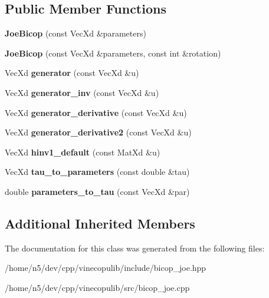 \subsection*{Public Member Functions}
\begin{DoxyCompactItemize}
\item 
{\bfseries Joe\+Bicop} (const Vec\+Xd \&parameters)\hypertarget{class_joe_bicop_a15feadcf7028ba91c041c05f7033289d}{}\label{class_joe_bicop_a15feadcf7028ba91c041c05f7033289d}

\item 
{\bfseries Joe\+Bicop} (const Vec\+Xd \&parameters, const int \&rotation)\hypertarget{class_joe_bicop_aae0e184fda31ed3a78520f70d4f4102e}{}\label{class_joe_bicop_aae0e184fda31ed3a78520f70d4f4102e}

\item 
Vec\+Xd {\bfseries generator} (const Vec\+Xd \&u)\hypertarget{class_joe_bicop_a3a9cd4684de97041f271ce1f40c32fa2}{}\label{class_joe_bicop_a3a9cd4684de97041f271ce1f40c32fa2}

\item 
Vec\+Xd {\bfseries generator\+\_\+inv} (const Vec\+Xd \&u)\hypertarget{class_joe_bicop_ad4d4ff3ee52eac61b526f10a8b12c400}{}\label{class_joe_bicop_ad4d4ff3ee52eac61b526f10a8b12c400}

\item 
Vec\+Xd {\bfseries generator\+\_\+derivative} (const Vec\+Xd \&u)\hypertarget{class_joe_bicop_a9ee3b11b81ae825369fc1a82f922d480}{}\label{class_joe_bicop_a9ee3b11b81ae825369fc1a82f922d480}

\item 
Vec\+Xd {\bfseries generator\+\_\+derivative2} (const Vec\+Xd \&u)\hypertarget{class_joe_bicop_a7613e4c3cd33efac94cf2d1ee7b9869d}{}\label{class_joe_bicop_a7613e4c3cd33efac94cf2d1ee7b9869d}

\item 
Vec\+Xd {\bfseries hinv1\+\_\+default} (const Mat\+Xd \&u)\hypertarget{class_joe_bicop_a5890e8c1c092be6791847868a7b6597a}{}\label{class_joe_bicop_a5890e8c1c092be6791847868a7b6597a}

\item 
Vec\+Xd {\bfseries tau\+\_\+to\+\_\+parameters} (const double \&tau)\hypertarget{class_joe_bicop_a213002b8d12025e0aa4a3e8d648a05d1}{}\label{class_joe_bicop_a213002b8d12025e0aa4a3e8d648a05d1}

\item 
double {\bfseries parameters\+\_\+to\+\_\+tau} (const Vec\+Xd \&par)\hypertarget{class_joe_bicop_adbb7cf686a892146ea2a963e781593eb}{}\label{class_joe_bicop_adbb7cf686a892146ea2a963e781593eb}

\end{DoxyCompactItemize}
\subsection*{Additional Inherited Members}


The documentation for this class was generated from the following files\+:\begin{DoxyCompactItemize}
\item 
/home/n5/dev/cpp/vinecopulib/include/bicop\+\_\+joe.\+hpp\item 
/home/n5/dev/cpp/vinecopulib/src/bicop\+\_\+joe.\+cpp\end{DoxyCompactItemize}

